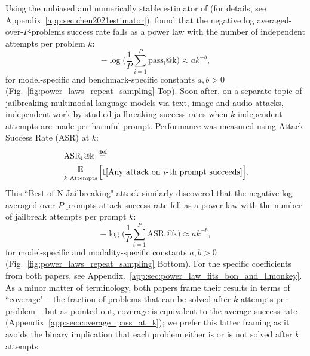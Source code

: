 Using the unbiased and numerically stable estimator of \citet{chen2021evaluatinglargelanguagemodels} (for details, see Appendix~\ref{app:sec:chen2021estimator}), \citet{brown2024largelanguagemonkeysscaling} found that the negative log averaged-over-$P$-problems success rate falls as a power law with the number of independent attempts per problem $k$:
%
\begin{equation}
-\log \Bigg( \frac{1}{P} \sum_{i=1}^P \operatorname{pass_i@k} \Bigg) \approx a k^{-b},
\end{equation}
%
for model-specific and benchmark-specific constants $a, b > 0$ (Fig.~\ref{fig:power_laws_repeat_sampling} Top). Soon after, on a separate topic of jailbreaking multimodal language models via text, image and audio attacks, independent work by \citet{hughes2024bestofnjailbreaking} studied jailbreaking success rates when $k$ independent attempts are made per harmful prompt. Performance was measured using Attack Success Rate (ASR) at $k$:
%
\begin{equation}
\begin{aligned}
&\operatorname{ASR_i@k} \, \defeq \,\\ &\mathop{\raisebox{3pt}{$\mathbb{E}$}}_{\substack{k \text{ Attempts}}}\Big[ \mathbb{I}[\text{Any attack on $i$-th prompt succeeds}] \Big].
\end{aligned}
\end{equation}
%
This ``Best-of-N Jailbreaking" attack similarly discovered that the negative log averaged-over-$P$-prompts attack success rate fell as a power law with the number of jailbreak attempts per prompt $k$:
%
\begin{equation}
-\log \Bigg( \frac{1}{P} \sum_{i=1}^P \operatorname{ASR_i@k} \Bigg)\approx a k^{-b},
\end{equation}
%
for model-specific and modality-specific constants $a, b > 0$ (Fig.~\ref{fig:power_laws_repeat_sampling} Bottom).
For the specific coefficients from both papers, see Appendix.~\ref{app:sec:power_law_fits_bon_and_llmonkey}.
As a minor matter of terminology, both papers frame their results in terms of ``coverage" -- the fraction of problems that can be solved after $k$ attempts per problem -- but as \citet{brown2024largelanguagemonkeysscaling} pointed out, coverage is equivalent to the average success rate (Appendix~\ref{app:sec:coverage_pass_at_k}); we prefer this latter framing as it avoids the binary implication that each problem either is or is not solved after $k$ attempts.